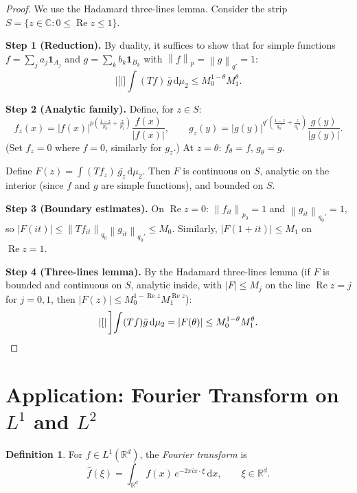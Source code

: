 \documentclass[a4paper,12pt]{book}
\newcommand{\R}{\mathbb{R}}
\newcommand{\C}{\mathbb{C}}
\newcommand{\dd}{\mathrm{d}}
\newcommand{\norm}[1]{\left\| #1 \right\|}
\newcommand{\abs}[1]{\left| #1 \right|}
\theoremstyle{definition}
\newtheorem{definition}{Definition}[chapter]
\theoremstyle{plain}
\theoremstyle{remark}
\begin{document}
\begin{proof}
We use the Hadamard three-lines lemma. Consider
the strip $S = \{z \in \C : 0 \le \operatorname{Re} z \le 1\}$.

\textbf{Step 1 (Reduction).} By duality, it suffices to show that for simple
functions $f = \sum_j a_j \mathbf{1}_{A_j}$ and $g = \sum_k b_k \mathbf{1}_{B_k}$
with $\norm{f}_p = \norm{g}_{q'} = 1$:
\[
  \abs[\bigg]{\int (Tf)\, \bar{g}\, \dd\mu_2} \le M_0^{1-\theta} M_1^\theta.
\]

\textbf{Step 2 (Analytic family).} Define, for $z \in S$:
\[
  f_z(x) = \abs{f(x)}^{p(\frac{1-z}{p_0} + \frac{z}{p_1})}
  \frac{f(x)}{\abs{f(x)}}, \qquad
  g_z(y) = \abs{g(y)}^{q'(\frac{1-z}{q_0'} + \frac{z}{q_1'})}
  \frac{g(y)}{\abs{g(y)}}.
\]
(Set $f_z = 0$ where $f = 0$, similarly for $g_z$.) At $z = \theta$:
$f_\theta = f$, $g_\theta = g$.

Define $F(z) = \int (Tf_z)\, \overline{g_z}\, \dd\mu_2$. Then $F$ is continuous
on $S$, analytic on the interior (since $f$ and $g$ are simple functions), and
bounded on $S$.

\textbf{Step 3 (Boundary estimates).} On $\operatorname{Re} z = 0$:
$\norm{f_{it}}_{p_0} = 1$ and $\norm{g_{it}}_{q_0'} = 1$, so
$\abs{F(it)} \le \norm{Tf_{it}}_{q_0}\norm{g_{it}}_{q_0'} \le M_0$.
Similarly, $\abs{F(1 + it)} \le M_1$ on $\operatorname{Re} z = 1$.

\textbf{Step 4 (Three-lines lemma).} By the Hadamard three-lines lemma (if
$F$ is bounded and continuous on $S$, analytic inside, with $\abs{F} \le M_j$
on the line $\operatorname{Re} z = j$ for $j = 0, 1$, then
$\abs{F(z)} \le M_0^{1 - \operatorname{Re} z} M_1^{\operatorname{Re} z}$):
\[
  \abs[\bigg]{\int (Tf)\bar{g}\, \dd\mu_2}
  = \abs{F(\theta)} \le M_0^{1-\theta} M_1^\theta. \qedhere
\]
\end{proof}


\section{Application: Fourier Transform on $L^1$ and $L^2$}
\label{sec:fourier-L1-L2}


\begin{definition}\label{def:fourier-L1}
For $f \in L^1(\R^d)$, the \emph{Fourier transform} is
\[
  \hat{f}(\xi) = \int_{\R^d} f(x)\, e^{-2\pi i x \cdot \xi}\, \dd x, \qquad \xi \in \R^d.
\]
\end{definition}
\end{document}
